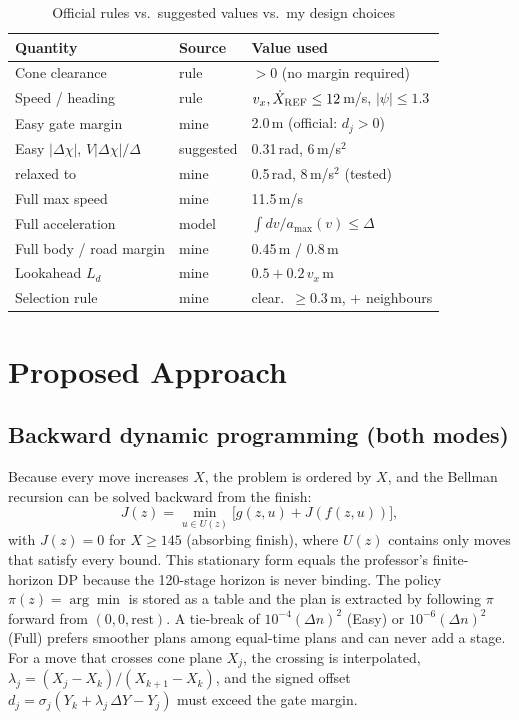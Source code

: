\documentclass[conference]{IEEEtran}
\begin{document}
\begin{table}[t]
\centering
\caption{Official rules vs.\ suggested values vs.\ my design choices}
\label{tab:rules}
\footnotesize
\setlength{\tabcolsep}{3pt}
\begin{tabular}{@{}lll@{}}
\toprule
Quantity & Source & Value used \\
\midrule
Cone clearance & rule & $>0$ (no margin required)\\
Speed / heading & rule & $v_x,\dot X_{\rm REF}\le12$\,m/s, $|\psi|\le1.3$\\
Easy gate margin & mine & 2.0\,m (official: $d_j>0$)\\
Easy $|\Delta\chi|$, $V|\Delta\chi|/\Delta$ & suggested & 0.31\,rad, 6\,m/s$^2$\\
\quad relaxed to & mine & 0.5\,rad, 8\,m/s$^2$ (tested)\\
Full max speed & mine & 11.5\,m/s\\
Full acceleration & model & $\int dv/a_{\max}(v)\le\Delta$\\
Full body / road margin & mine & 0.45\,m / 0.8\,m\\
Lookahead $L_d$ & mine & $0.5+0.2\,v_x$\,m\\
Selection rule & mine & clear.\ $\ge0.3$\,m, + neighbours\\
\bottomrule
\end{tabular}
\end{table}

\section{Proposed Approach}
\subsection{Backward dynamic programming (both modes)}
Because every move increases $X$, the problem is ordered by $X$, and the
Bellman recursion can be solved backward from the finish:
\begin{equation}
J(z)=\min_{u\in U(z)}\bigl[g(z,u)+J(f(z,u))\bigr],
\label{eq:bellman}
\end{equation}
with $J(z)=0$ for $X\ge145$ (absorbing finish), where $U(z)$ contains only moves that satisfy every bound. This stationary form
equals the professor's finite-horizon DP because the 120-stage horizon is never
binding. The policy $\pi(z)=\arg\min$ is stored as a table and the plan is
extracted by following $\pi$ forward from $(0,0,\text{rest})$. A tie-break of
$10^{-4}(\Delta n)^2$ (Easy) or $10^{-6}(\Delta n)^2$ (Full) prefers smoother
plans among equal-time plans and can never add a stage. For a move that crosses
cone plane $X_j$, the crossing is interpolated,
$\lambda_j=(X_j-X_k)/(X_{k+1}-X_k)$, and the signed offset
$d_j=\sigma_j(Y_k+\lambda_j\,\Delta Y-Y_j)$ must exceed the gate margin.
\end{document}
